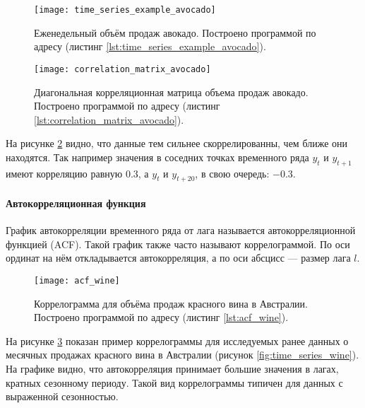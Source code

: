 \begin{figure}[h!]
    \centering
    \texttt{[image: time\_series\_example\_avocado]}
    \caption{Еженедельный объём продаж авокадо. Построено программой по адресу 
    (листинг \ref{lst:time_series_example_avocado}).}
    \label{fig:time_series_avocado}
\end{figure}

\begin{figure}[h!]
    \centering
    \texttt{[image: correlation\_matrix\_avocado]}
    \caption{Диагональная корреляционная матрица объема продаж авокадо. Построено 
    программой по адресу (листинг \ref{lst:correlation_matrix_avocado}).}
    \label{fig:correlation_matrix_avocado}
\end{figure}

\newpage

На рисунке \ref{fig:correlation_matrix_avocado} видно, что данные тем сильнее 
скоррелированны, чем ближе они находятся. Так например значения в соседних точках 
временного ряда $y_t$ и $y_{t+1}$ имеют корреляцию равную $0.3$, а $y_t$ и $y_{t+20}$, 
в свою очередь: $-0.3$.

\paragraph{Автокорреляционная функция}

График автокорреляции временного ряда от лага называется автокорреляционной 
функцией (ACF). Такой график также часто называют коррелограммой. По оси ординат на 
нём откладывается автокорреляция, а по оси абсцисс — размер лага $l$.

\begin{figure}[h!]
    \centering
    \texttt{[image: acf\_wine]}
    \caption{Коррелограмма для объёма продаж красного вина в Австралии. Построено 
    программой по адресу (листинг \ref{lst:acf_wine}).}
    \label{fig:acf_wine}
\end{figure}

На рисунке \ref{fig:acf_wine} показан пример коррелограммы для исследуемых 
ранее данных о месячных продажах красного вина в Австралии 
(рисунок \ref{fig:time_series_wine}). На графике видно, что автокорреляция принимает 
большие значения в лагах, кратных сезонному периоду. Такой вид коррелограммы 
типичен для данных с выраженной сезонностью.

